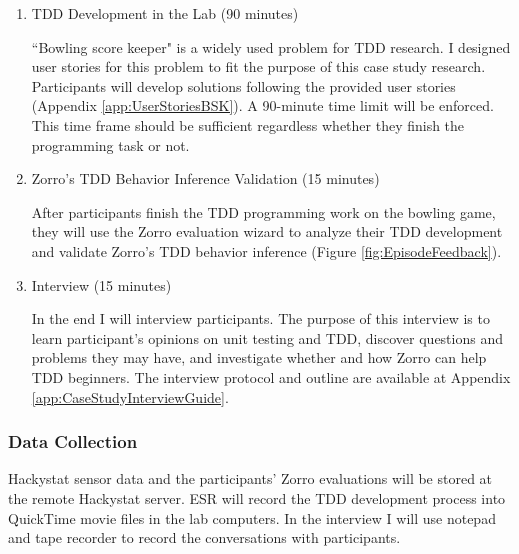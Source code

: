 \begin{enumerate}
\item{TDD Development in the Lab (90 minutes)}

``Bowling score keeper" is a widely used problem for TDD research. I
designed user stories for this problem to fit the purpose of this case
study research. Participants will develop solutions following the
provided user stories (Appendix \ref{app:UserStoriesBSK}). A 90-minute time
limit will be enforced. This time frame should be sufficient
regardless whether they finish the programming task or not.

\item{Zorro's TDD Behavior Inference Validation (15 minutes)}

After participants finish the TDD programming work on the bowling
game, they will use the Zorro evaluation wizard to analyze their TDD
development and validate Zorro's TDD behavior inference (Figure
\ref{fig:EpisodeFeedback}).

\item{Interview (15 minutes)}

In the end I will interview participants. The purpose of this
interview is to learn participant's opinions on unit testing and TDD,
discover questions and problems they may have, and investigate whether and
how Zorro can help TDD beginners. The interview protocol and outline
are available at Appendix \ref{app:CaseStudyInterviewGuide}.

\end{enumerate}

\subsubsection{Data Collection}
Hackystat sensor data and the participants' Zorro evaluations will 
be stored at the remote Hackystat server. ESR will record the TDD 
development process into QuickTime movie files in the lab computers. 
In the interview I will use notepad and tape recorder to record 
the conversations with participants.

